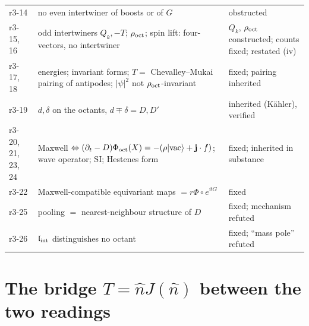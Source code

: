 {\begin{longtable}{@{}>{\raggedright\arraybackslash}p{}>{\raggedright\arraybackslash}p{}>{\raggedright\arraybackslash}p{}@{}}
r3-14 & no even intertwiner of boosts or of $G$ & obstructed\\
r3-15, 16 & odd intertwiners $Q_k,-T$; $\rho_{\rm oct}$; spin lift: four-vectors, no intertwiner & $Q_k$, $\rho_{\rm oct}$ constructed; counts fixed; restated (iv)\\
r3-17, 18 & energies; invariant forms; $T=$ Chevalley--Mukai pairing of antipodes; $|\psi|^2$ not $\rho_{\rm oct}$-invariant & fixed; pairing inherited\\
r3-19 & $d,\delta$ on the octants, $d\mp\delta=D,D'$ & inherited (K\"ahler), verified\\
r3-20, 21, 23, 24 & Maxwell $\Leftrightarrow(\partial_t-D)\Phi_{\rm oct}(X)=-(\rho|\mathrm{vac}\rangle+\mathbf j\cdot f)$; wave operator; SI; Hestenes form & fixed; inherited in substance\\
r3-22 & Maxwell-compatible equivariant maps $=r\Phi\circ e^{\vartheta G}$ & fixed\\
r3-25 & pooling $=$ nearest-neighbour structure of $D$ & fixed; mechanism refuted\\
r3-26 & $\mathfrak l_{\rm int}$ distinguishes no octant & fixed; ``mass pole'' refuted\\
\bottomrule
\end{longtable}}


\section{\texorpdfstring{The bridge $T=\hat nJ(\hat n)$ between the two readings}{The bridge T = nJ(n) between the two readings}}
\label{r4:sec:main}

